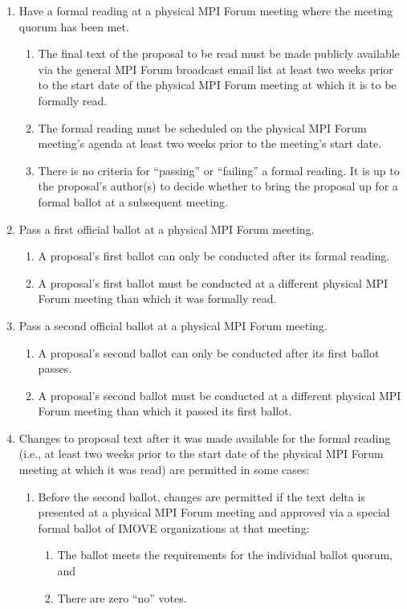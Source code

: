 \begin{enumerate}
\item Have a formal reading at a physical MPI Forum meeting where the
  meeting quorum has been met.
  \begin{enumerate}
  \item The final text of the proposal to be read must be made
    publicly available via the general MPI Forum broadcast email list
    at least two weeks prior to the start date of the physical MPI
    Forum meeting at which it is to be formally read.
  \item The formal reading must be scheduled on the physical MPI Forum
    meeting's agenda at least two weeks prior to the meeting's start
    date.
  \item There is no criteria for ``passing'' or ``failing'' a formal
    reading.  It is up to the proposal's author(s) to decide whether
    to bring the proposal up for a formal ballot at a subsequent
    meeting.
  \end{enumerate}

\item Pass a first official ballot at a physical MPI Forum meeting.
  \begin{enumerate}
  \item A proposal's first ballot can only be conducted after its
    formal reading.
  \item A proposal's first ballot must be conducted at a different
    physical MPI Forum meeting than which it was formally read.
  \end{enumerate}

\item Pass a second official ballot at a physical MPI Forum meeting.
  \begin{enumerate}
  \item A proposal's second ballot can only be conducted after its
    first ballot passes.
  \item A proposal's second ballot must be conducted at a different
    physical MPI Forum meeting than which it passed its first ballot.
  \end{enumerate}

\item Changes to proposal text after it was made available for the
  formal reading (i.e., at least two weeks prior to the start date of
  the physical MPI Forum meeting at which it was read) are permitted
  in some cases:
  \begin{enumerate}
  \item Before the second ballot, changes are permitted if the text
    delta is presented at a physical MPI Forum meeting and approved
    via a special formal ballot of IMOVE organizations at that
    meeting:
    \begin{enumerate}
    \item The ballot meets the requirements for the individual
      ballot quorum, and
    \item There are zero ``no'' votes.
    \end{enumerate}
    

\end{enumerate}
\end{enumerate}
